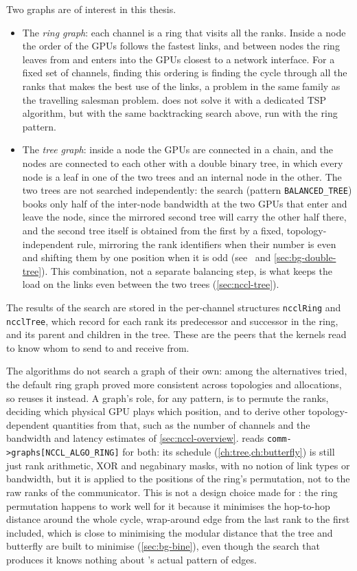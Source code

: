 Two graphs are of interest in this thesis.
\begin{itemize}
  \item The \emph{ring graph}: each channel is a ring that visits all the ranks. Inside a node the order of the GPUs follows the fastest links, and between nodes the ring leaves from and enters into the GPUs closest to a network interface.
  For a fixed set of channels, finding this ordering is finding the cycle through all the ranks that makes the best use of the links, a problem in the same family as the travelling salesman problem. \nccl{} does not solve it with a dedicated TSP algorithm, but with the same backtracking search above, run with the ring pattern.
  \item The \emph{tree graph}: inside a node the GPUs are connected in a chain, and the nodes are connected to each other with a double binary tree, in which every node is a leaf in one of the two trees and an internal node in the other.
  The two trees are not searched independently: the search (pattern \texttt{BALANCED\_TREE}) books only half of the inter-node bandwidth at the two GPUs that enter and leave the node, since the mirrored second tree will carry the other half there, and the second tree itself is obtained from the first by a fixed, topology-independent rule, mirroring the rank identifiers when their number is even and shifting them by one position when it is odd (see~\cite{hu2025demystifying} and \cref{sec:bg-double-tree}). This combination, not a separate balancing step, is what keeps the load on the links even between the two trees (\cref{sec:nccl-tree}).
\end{itemize}
The results of the search are stored in the per-channel structures \texttt{ncclRing} and \texttt{ncclTree}, which record for each rank its predecessor and successor in the ring, and its parent and children in the tree.
These are the peers that the kernels read to know whom to send to and receive from.

The \bine{} algorithms do not search a graph of their own: among the alternatives tried, the default ring graph proved more consistent across topologies and allocations, so \bine{} reuses it instead.
A graph's role, for any pattern, is to permute the ranks, deciding which physical GPU plays which position, and to derive other topology-dependent quantities from that, such as the number of channels and the bandwidth and latency estimates of \cref{sec:nccl-overview}.
\bine{} reads \texttt{comm->graphs[NCCL\_ALGO\_RING]} for both: its schedule (\cref{ch:tree,ch:butterfly}) is still just rank arithmetic, XOR and negabinary masks, with no notion of link types or bandwidth, but it is applied to the positions of the ring's permutation, not to the raw ranks of the communicator.
This is not a design choice made for \bine{}: the ring permutation happens to work well for it because it minimises the hop-to-hop distance around the whole cycle, wrap-around edge from the last rank to the first included, which is close to minimising the modular distance that the \bine{} tree and butterfly are built to minimise (\cref{sec:bg-bine}), even though the search that produces it knows nothing about \bine{}'s actual pattern of edges.

